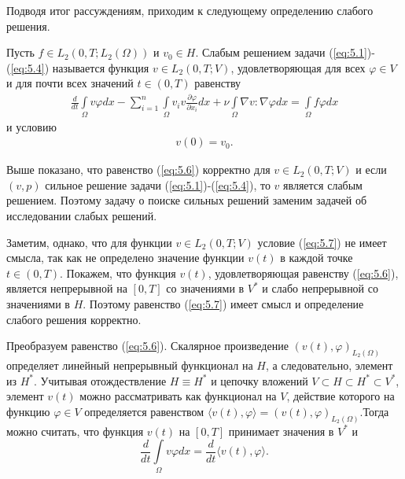 Подводя итог рассуждениям, приходим к следующему определению слабого решения.
\begin{definition}
    Пусть $f\in L_2(0,T;L_2(\Omega))$ и $v_0\in H$. Слабым решением задачи (\ref{eq:5.1})-(\ref{eq:5.4}) называется функция $v\in L_2(0, T;V)$,
    удовлетворяющая для всех $\varphi \in V$ и для почти всех значений $t \in (0, T)$ равенству
    \begin{equation}\label{eq:5.6}
        \begin{gathered}
            \frac{d}{dt}\int\limits_\Omega v \varphi dx-\sum_{i=1}^{n}\int\limits_\Omega v_i v
            \frac{\partial \varphi }{\partial x_i}dx + \nu\int\limits_\Omega \nabla v :\nabla\varphi dx=
            \int\limits_\Omega f \varphi dx
        \end{gathered}
    \end{equation}
    и условию
    \begin{equation}\label{eq:5.7}
        \begin{gathered}
            v(0) = v_0.
        \end{gathered}
    \end{equation}
\end{definition}

Выше показано, что равенство (\ref{eq:5.6}) корректно для $v \in L_2(0, T; V)$ и если $(v, p)$ сильное решение задачи (\ref{eq:5.1})-(\ref{eq:5.4}),
то $v$ является слабым решением. Поэтому задачу о поиске сильных решений заменим задачей об исследовании слабых решений.

Заметим, однако, что для функции $v \in L_2(0, T; V)$ условие (\ref{eq:5.7}) не имеет смысла, так как не определено значение функции $v(t)$ в каждой точке
$t \in (0, T)$. Покажем, что функция $v(t)$, удовлетворяющая равенству (\ref{eq:5.6}), является непрерывной на $[0, T]$ со значениями в $V^\ast$ и слабо
непрерывной со значениями в $H$. Поэтому равенство (\ref{eq:5.7}) имеет смысл и определение слабого решения корректно.

Преобразуем равенство (\ref{eq:5.6}). Скалярное произведение $(v(t), \varphi)_{L_2(\Omega)}$ определяет линейный непрерывный функционал на $H$, а следовательно,
элемент из $H^\ast$. Учитывая отождествление $H \equiv H^\ast$ и цепочку вложений $V \subset H \subset H^\ast \subset V^\ast$,
элемент $v(t)$ можно рассматривать как функционал на $V$, действие которого на функцию $\varphi \in V$ определяется равенством 
$\langle v(t),\varphi \rangle = (v(t),\varphi)_{L_2(\Omega)}$.Тогда можно считать, что функция $v(t)$ на $[0, T]$ принимает значения в $V^\ast$ и
$$\frac{d}{dt}\int\limits_\Omega v \varphi dx=\frac{d}{dt}\langle v(t),\varphi \rangle.$$

